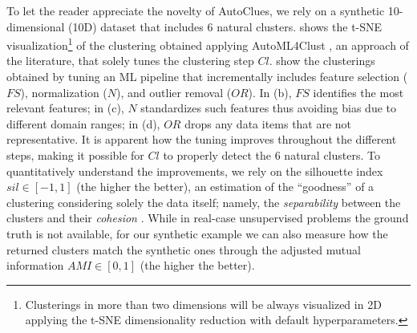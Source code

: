 \documentclass[runningheads]{llncs}
\begin{document}
To let the reader appreciate the novelty of AutoClues, we rely on a synthetic 10-dimensional (10D) dataset that includes 6 natural clusters.  shows the t-SNE \cite{van2008visualizing} visualization\footnote{Clusterings in more than two dimensions will be always visualized in 2D applying the t-SNE dimensionality reduction with default hyperparameters.}  of the clustering obtained applying AutoML4Clust \cite{Tschechlov2021}, an approach of the literature, that solely tunes the clustering step $Cl$.  show the clusterings obtained by tuning an ML pipeline that incrementally includes feature selection ($FS$), normalization ($N$), and outlier removal ($OR$). In (b), $FS$ identifies the most relevant features; in (c), $N$ standardizes such features thus avoiding bias due to different domain ranges; in (d), $OR$ drops any data items that are not representative. 
It is apparent how the tuning improves throughout the different steps, making it possible for $Cl$ to properly detect the 6 natural clusters. 
To quantitatively understand the improvements, we rely on the silhouette index $sil \in [-1, 1]$ (the higher the better), an estimation of the ``goodness'' of a clustering considering solely the data itself; namely, the \textit{separability} between the clusters and their \textit{cohesion} \cite{zhu2010clustering}.
While in real-case unsupervised problems the ground truth is not available, for our synthetic example we can also measure how the returned clusters match the synthetic ones through the adjusted mutual information \cite{vinh2009information} $AMI \in [0, 1]$ (the higher the better).
\end{document}
